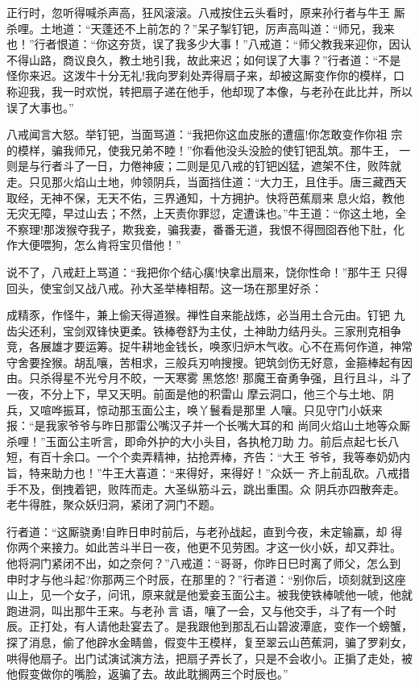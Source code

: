 正行时，忽听得喊杀声高，狂风滚滚。八戒按住云头看时，原来孙行者与牛王
厮杀哩。土地道：“天蓬还不上前怎的？”呆子掣钉钯，厉声高叫道：“师兄，我来
也！”行者恨道：“你这夯货，误了我多少大事！”八戒道：“师父教我来迎你，因认
不得山路，商议良久，教土地引我，故此来迟；如何误了大事？”行者道：“不是
怪你来迟。这泼牛十分无礼!我向罗刹处弄得扇子来，却被这厮变作你的模样，口
称迎我，我一时欢悦，转把扇子递在他手，他却现了本像，与老孙在此比并，所以
误了大事也。”

八戒闻言大怒。举钉钯，当面骂道：“我把你这血皮胀的遭瘟!你怎敢变作你祖
宗的模样，骗我师兄，使我兄弟不睦！”你看他没头没脸的使钉钯乱筑。那牛王，
一则是与行者斗了一日，力倦神疲；二则是见八戒的钉钯凶猛，遮架不住，败阵就
走。只见那火焰山土地，帅领阴兵，当面挡住道：“大力王，且住手。唐三藏西天
取经，无神不保，无天不佑，三界通知，十方拥护。快将芭蕉扇来息火焰，教他
无灾无障，早过山去；不然，上天责你罪愆，定遭诛也。”牛王道：“你这土地，全
不察理!那泼猴夺我子，欺我妾，骗我妻，番番无道，我恨不得囫囵吞他下肚，化
作大便喂狗，怎么肯将宝贝借他！”

说不了，八戒赶上骂道：“我把你个结心癀!快拿出扇来，饶你性命！”那牛王
只得回头，使宝剑又战八戒。孙大圣举棒相帮。这一场在那里好杀：

成精豕，作怪牛，兼上偷天得道猴。禅性自来能战炼，必当用土合元由。钉钯
九齿尖还利，宝剑双锋快更柔。铁棒卷舒为主仗，土神助力结丹头。三家刑克相争
竞，各展雄才要运筹。捉牛耕地金钱长，唤豕归炉木气收。心不在焉何作道，神常
守舍要拴猴。胡乱嚷，苦相求，三般兵刃响搜搜。钯筑剑伤无好意，金箍棒起有因
由。只杀得星不光兮月不皎，一天寒雾
黑悠悠!
那魔王奋勇争强，且行且斗，斗了一夜，不分上下，早又天明。前面是他的积雷山
摩云洞口，他三个与土地、阴兵，又喧哗振耳，惊动那玉面公主，唤丫鬟看是那里
人嚷。只见守门小妖来报：“是我家爷爷与昨日那雷公嘴汉子并一个长嘴大耳的和
尚同火焰山土地等众厮杀哩！”玉面公主听言，即命外护的大小头目，各执枪刀助
力。前后点起七长八短，有百十余口。一个个卖弄精神，拈抢弄棒，齐告：“大王
爷爷，我等奉奶奶内旨，特来助力也！”牛王大喜道：“来得好，来得好！”众妖一
齐上前乱砍。八戒措手不及，倒拽着钯，败阵而走。大圣纵筋斗云，跳出重围。众
阴兵亦四散奔走。老牛得胜，聚众妖归洞，紧闭了洞门不题。

行者道：“这厮骁勇!自昨日申时前后，与老孙战起，直到今夜，未定输赢，却
得你两个来接力。如此苦斗半日一夜，他更不见劳困。才这一伙小妖，却又莽壮。
他将洞门紧闭不出，如之奈何？”八戒道：“哥哥，你昨日巳时离了师父，怎么到
申时才与他斗起?你那两三个时辰，在那里的？”行者道：“别你后，顷刻就到这座
山上，见一个女子，问讯，原来就是他爱妾玉面公主。被我使铁棒唬他一唬，他就
跑进洞，叫出那牛王来。与老孙言语，嚷了一会，又与他交手，斗了有一个时
辰。正打处，有人请他赴宴去了。是我跟他到那乱石山碧波潭底，变作一个螃蟹，
探了消息，偷了他辟水金睛兽，假变牛王模样，复至翠云山芭蕉洞，骗了罗刹女，
哄得他扇子。出门试演试演方法，把扇子弄长了，只是不会收小。正掮了走处，被
他假变做你的嘴脸，返骗了去。故此耽搁两三个时辰也。”

